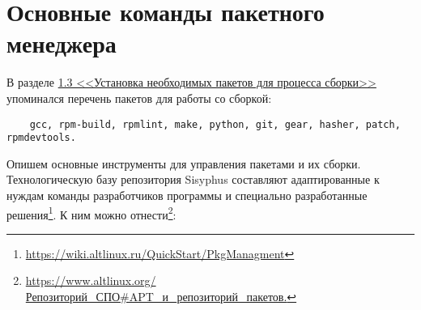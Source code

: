 \chapter{Основные команды пакетного менеджера}\label{software-used-for-packaging}

В разделе \hyperlink{1.3}{1.3 <<Установка необходимых пакетов для процесса сборки>>} упоминался перечень пакетов для работы со сборкой:
\begin{verbatim}
	gcc, rpm-build, rpmlint, make, python, git, gear, hasher, patch, rpmdevtools.
\end{verbatim}

Опишем основные инструменты для управления пакетами и их сборки. Технологическую базу репозитория Sisyphus составляют адаптированные к нуждам команды разработчиков программы и специально разработанные решения\footnote{\href{https://wiki.altlinux.ru/QuickStart/PkgManagment\#\%D0\%9E\%D1\%81\%D0\%BD\%D0\%BE\%D0\%B2\%D0\%BD\%D1\%8B\%D0\%B5_\%D0\%B8\%D0\%BD\%D1\%81\%D1\%82\%D1\%80\%D1\%83\%D0\%BC\%D0\%B5\%D0\%BD\%D1\%82\%D1\%8B_\%D0\%B4\%D0\%BB\%D1\%8F_\%D1\%83\%D0\%BF\%D1\%80\%D0\%B0\%D0\%B2\%D0\%BB\%D0\%B5\%D0\%BD\%D0\%B8\%D1\%8F_\%D0\%BF\%D0\%B0\%D0\%BA\%D0\%B5\%D1\%82\%D0\%B0\%D0\%BC\%D0\%B8}{https://wiki.altlinux.ru/QuickStart/PkgManagment}}. К ним можно отнести\footnote{\href{https://www.altlinux.org/\%D0\%A0\%D0\%B5\%D0\%BF\%D0\%BE\%D0\%B7\%D0\%B8\%D1\%82\%D0\%BE\%D1\%80\%D0\%B8\%D0\%B9_\%D0\%A1\%D0\%9F\%D0\%9E\#APT_\%D0\%B8_\%D1\%80\%D0\%B5\%D0\%BF\%D0\%BE\%D0\%B7\%D0\%B8\%D1\%82\%D0\%BE\%D1\%80\%D0\%B8\%D0\%B9_\%D0\%BF\%D0\%B0\%D0\%BA\%D0\%B5\%D1\%82\%D0\%BE\%D0\%B2}{https://www.altlinux.org/Репозиторий\_СПО\#APT\_и\_репозиторий\_пакетов.}}:
